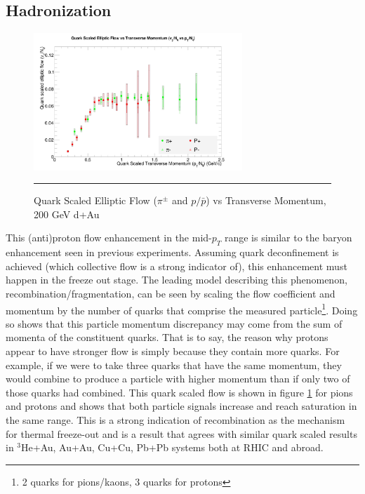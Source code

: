 \subsection{Hadronization}
\begin{figure}[hbtp]
\centering    
    \includegraphics[width=0.7\textwidth]{results/v2NqvspT.jpg}
    \rule{35em}{0.5pt}
    \caption[Quark Scaled Elliptic Flow ($\pi^{\pm}$ and $p/\bar{p}$) vs Transverse Momentum, 200 GeV d+Au]{Quark Scaled Elliptic Flow ($\pi^{\pm}$ and $p/\bar{p}$) vs Transverse Momentum, 200 GeV d+Au}
    \label{fig:qscaledv2}
\end{figure}

This (anti)proton flow enhancement in the mid-$p_T$ range is similar to the baryon enhancement seen in previous experiments. Assuming quark deconfinement is achieved (which collective flow is a strong indicator of), this enhancement must happen in the freeze out stage. The leading model describing this phenomenon, recombination/fragmentation, can be seen by scaling the flow coefficient and momentum by the number of quarks that comprise the measured particle\footnote{2 quarks for pions/kaons, 3 quarks for protons}. Doing so shows that this particle momentum discrepancy may come from the sum of momenta of the constituent quarks. That is to say, the reason why protons appear to have stronger flow is simply because they contain more quarks. For example, if we were to take three quarks that have the same momentum, they would combine to produce a particle with higher momentum than if only two of those quarks had combined. This quark scaled flow is shown in figure \ref{fig:qscaledv2} for pions and protons and shows that both particle signals increase and reach saturation in the same range. This is a strong indication of recombination as the mechanism for thermal freeze-out and is a result that agrees with similar quark scaled results in $^3$He+Au\citep{huangQM2015}, Au+Au\citep{Adler:2003kt}, Cu+Cu\citep{PhysRevC.92.034913}, Pb+Pb\citep{Noferini:2012ps} systems both at RHIC and abroad.

